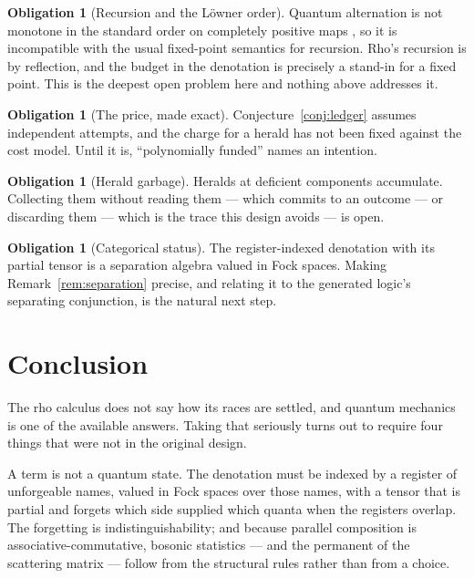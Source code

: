 \documentclass[11pt,a4paper]{article}
\theoremstyle{plain}
\theoremstyle{definition}
\newtheorem{obligation}[theorem]{Obligation}
\theoremstyle{remark}
\begin{document}
\begin{obligation}[Recursion and the Löwner order]\label{ob:recursion}
Quantum alternation is not monotone in the standard order on completely positive
maps \cite{BadescuPanangaden}, so it is incompatible with the usual fixed-point
semantics for recursion. Rho's recursion is by reflection, and the budget in the
denotation is precisely a stand-in for a fixed point. This is the deepest open
problem here and nothing above addresses it.
\end{obligation}

\begin{obligation}[The price, made exact]\label{ob:price}
Conjecture~\ref{conj:ledger} assumes independent attempts, and the charge for a
herald has not been fixed against the cost model. Until it is,
``polynomially funded'' names an intention.
\end{obligation}

\begin{obligation}[Herald garbage]\label{ob:garbage}
Heralds at deficient components accumulate. Collecting them without reading them
--- which commits to an outcome --- or discarding them --- which is the trace
this design avoids --- is open.
\end{obligation}

\begin{obligation}[Categorical status]\label{ob:cat}
The register-indexed denotation with its partial tensor is a separation algebra
valued in Fock spaces. Making Remark~\ref{rem:separation} precise, and relating
it to the generated logic's separating conjunction, is the natural next step.
\end{obligation}

\section{Conclusion}\label{sec:conc}

The rho calculus does not say how its races are settled, and quantum mechanics
is one of the available answers. Taking that seriously turns out to require four
things that were not in the original design.

A term is not a quantum state. The denotation must be indexed by a register of
unforgeable names, valued in Fock spaces over those names, with a tensor that is
partial and forgets which side supplied which quanta when the registers overlap.
The forgetting is indistinguishability; and because parallel composition is
associative-commutative, bosonic statistics --- and the permanent of the
scattering matrix --- follow from the structural rules rather than from a choice.
\end{document}
